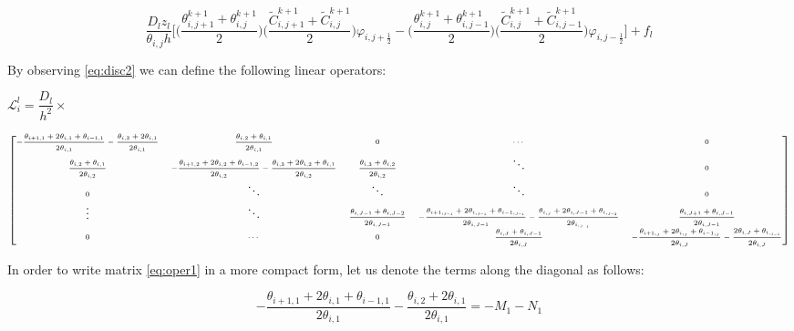 \documentclass[11pt,a4paper]{article}
\begin{document}
\begin{flushleft}
\begin{equation}
\dfrac{D_l z_l}{\theta_{i,j} h}\bigg[\Big(\dfrac{\theta^{k+1}_{i,j+1}+ \theta^{k+1}_{i,j}}{2}\Big)\Big(\dfrac{\widetilde C^{k+1}_{i,j+1}+\widetilde C^{k+1}_{i,j}}{2}\Big)\varphi_{i,j+\frac{1}{2}} - \Big(\dfrac{\theta^{k+1}_{i,j}+ \theta^{k+1}_{i,j-1}}{2}\Big)\Big(\dfrac{\widetilde C^{k+1}_{i,j}+\widetilde C^{k+1}_{i,j-1}}{2}\Big)\varphi_{i,j-\frac{1}{2}}\bigg] + f_l
 \label{eq:disc2}
\end{equation}

\begin{landscape}

By observing \ref{eq:disc2} we can define the following linear operators:

\bigskip $\mathcal{L}^l_{i}=\dfrac{D_l}{h^2} \times$

\begin{equation}
\label{eq:oper1}
{\fontsize{0.20cm}{0.1em}  {\begin{bmatrix}
-\dfrac{\theta_{i+1,1}+2\theta_{i,1}+\theta_{i-1,1}}{2\theta_{i,1}}-\dfrac{\theta_{i,2}+2\theta_{i,1}}{2\theta_{i,1}} & \dfrac{\theta_{i,2}+\theta_{i,1}}{2\theta_{i,1}}& 0 & \cdots & 0\\
\dfrac{\theta_{i,2}+\theta_{i,1}}{2\theta_{i,2}}  & -\dfrac{\theta_{i+1,2}+2\theta_{i,2}+\theta_{i-1,2}}{2\theta_{i,2}} -\dfrac{\theta_{i,3}+2\theta_{i,2}+\theta_{i,1}}{2\theta_{i,2}} & \dfrac{\theta_{i,3}+\theta_{i,2}}{2\theta_{i,2}}  & \ddots & 0\\
0 & \ddots & \ddots & \ddots & 0\\
\vdots & \ddots & \dfrac{\theta_{i,J-1}+\theta_{i,J-2}}{2\theta_{i,J-1}}  & -\dfrac{\theta_{{i+1,}_{J-1}}+2\theta_{{i,}_{J-1}}+\theta_{{i-1,}_{J-1}}}{2\theta_{i,J-1}}-\dfrac{\theta_{{i,}_{J}}+2\theta_{i,J-1}+\theta_{{i,}_{J-2}}}{2\theta_{{i,}_{J-1}}}  & \dfrac{\theta_{i,J+1}+\theta_{i,J-1}}{2\theta_{i,J-1}}\\
0 & \cdots & 0 & \dfrac{\theta_{i,J}+\theta_{i,J-1}}{2\theta_{i,J}}  & -\dfrac{\theta_{{i+1,}_{J}}+2\theta_{{i,}_{J}}+\theta_{{i-1,}_{J}}}{2\theta_{i,J}}-\dfrac{2\theta_{i,J}+\theta_{{i,}_{J-1}}}{2\theta_{i,J}}\\
\end{bmatrix}}}
\end{equation}

\bigskip In order to write matrix \ref{eq:oper1} in a more compact form, let us denote the terms along the diagonal as follows:

$$  -\dfrac{\theta_{i+1,1}+2\theta_{i,1}+\theta_{i-1,1}}{2\theta_{i,1}}-\dfrac{\theta_{i,2}+2\theta_{i,1}}{2\theta_{i,1}} = -M_1 - N_1 $$


\end{landscape}
\end{flushleft}
\end{document}
